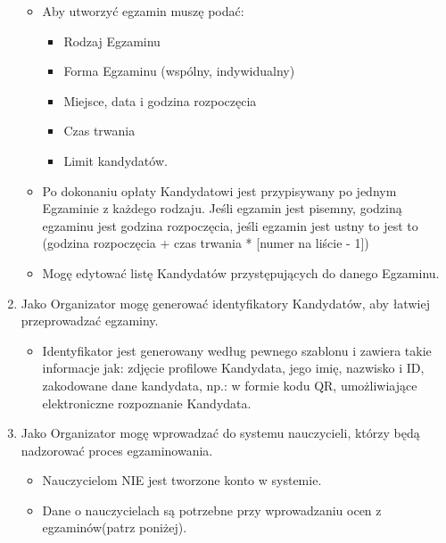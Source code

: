 \documentclass{article}
\begin{document}
\begin{enumerate}
      \begin{itemize}
         \item Aby utworzyć egzamin muszę podać: 
            \begin{itemize}
                \item Rodzaj Egzaminu
                \item Forma Egzaminu (wspólny, indywidualny)
                \item Miejsce, data i godzina rozpoczęcia
                \item Czas trwania
                \item Limit kandydatów.
            \end{itemize}
         \item Po dokonaniu opłaty Kandydatowi jest przypisywany po jednym Egzaminie z każdego rodzaju. Jeśli egzamin jest pisemny, godziną egzaminu jest godzina rozpoczęcia, jeśli egzamin jest ustny to jest to (godzina rozpoczęcia + czas trwania * [numer na liście - 1])
         \item Mogę edytować listę Kandydatów przystępujących do danego Egzaminu.
       \end{itemize}
  \item Jako Organizator mogę generować identyfikatory Kandydatów, aby łatwiej przeprowadzać egzaminy.
      \begin{itemize}
         \item Identyfikator jest generowany według pewnego szablonu i zawiera takie informacje jak: zdjęcie profilowe Kandydata, jego imię, nazwisko i ID, zakodowane dane kandydata, np.: w formie kodu QR, umożliwiające elektroniczne rozpoznanie Kandydata.
       \end{itemize}
  \item Jako Organizator mogę wprowadzać do systemu nauczycieli, którzy będą nadzorować proces egzaminowania.
      \begin{itemize}
         \item Nauczycielom NIE jest tworzone konto w systemie.
         \item Dane o nauczycielach są potrzebne przy wprowadzaniu ocen z egzaminów(patrz poniżej).
       \end{itemize}
\end{enumerate}
\end{document}
